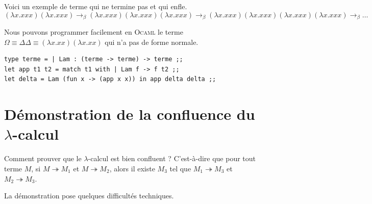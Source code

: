 \vspace{1cm}
Voici un exemple de terme qui ne termine pas et qui enfle.
$$ (\lambda x.xxx)(\lambda x.xxx) \rightarrow _\beta (\lambda x.xxx)(\lambda x.xxx)(\lambda x.xxx)
\rightarrow _\beta (\lambda x.xxx)(\lambda x.xxx)(\lambda x.xxx)(\lambda x.xxx) \rightarrow _\beta \ldots
$$  

Nous pouvons programmer facilement en \textsc{Ocaml} le terme $\Omega \equiv \Delta \Delta \equiv (\lambda x.xx)(\lambda x.xx)$
qui n'a pas de forme normale.
\begin{verbatim}
type terme = | Lam : (terme -> terme) -> terme ;;
let app t1 t2 = match t1 with | Lam f -> f t2 ;;
let delta = Lam (fun x -> (app x x)) in app delta delta ;;
\end{verbatim} 


\section{Démonstration de la confluence du $\lambda$-calcul}
Comment prouver que le $\lambda$-calcul est bien confluent ? C'est-à-dire que pour tout terme $M$, si $M\twoheadrightarrow M_1$ et
  $ M\twoheadrightarrow M_2 $,
alors il existe $M_3$ tel que $M_1\twoheadrightarrow M_3$ et  $M_2\twoheadrightarrow  M_3$.

La démonstration pose quelques difficultés techniques.

